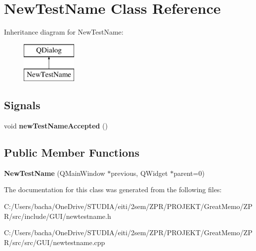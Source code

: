 \hypertarget{class_new_test_name}{}\section{New\+Test\+Name Class Reference}
\label{class_new_test_name}
Inheritance diagram for New\+Test\+Name\+:\begin{figure}[H]
\begin{center}
\leavevmode
\includegraphics[height=2.000000cm]{class_new_test_name}
\end{center}
\end{figure}
\subsection*{Signals}
\begin{DoxyCompactItemize}
\item 
\mbox{\label{class_new_test_name_a8d551f41650e7432ad0b57961c5ee501}} 
void {\bfseries new\+Test\+Name\+Accepted} ()
\end{DoxyCompactItemize}
\subsection*{Public Member Functions}
\begin{DoxyCompactItemize}
\item 
\mbox{\label{class_new_test_name_ad726eaaee4e37d1c095f99c5c581fce6}} 
{\bfseries New\+Test\+Name} (Q\+Main\+Window $\ast$previous, Q\+Widget $\ast$parent=0)
\end{DoxyCompactItemize}


The documentation for this class was generated from the following files\+:\begin{DoxyCompactItemize}
\item 
C\+:/\+Users/bacha/\+One\+Drive/\+S\+T\+U\+D\+I\+A/eiti/2sem/\+Z\+P\+R/\+P\+R\+O\+J\+E\+K\+T/\+Great\+Memo/\+Z\+P\+R/src/include/\+G\+U\+I/newtestname.\+h\item 
C\+:/\+Users/bacha/\+One\+Drive/\+S\+T\+U\+D\+I\+A/eiti/2sem/\+Z\+P\+R/\+P\+R\+O\+J\+E\+K\+T/\+Great\+Memo/\+Z\+P\+R/src/src/\+G\+U\+I/newtestname.\+cpp\end{DoxyCompactItemize}

